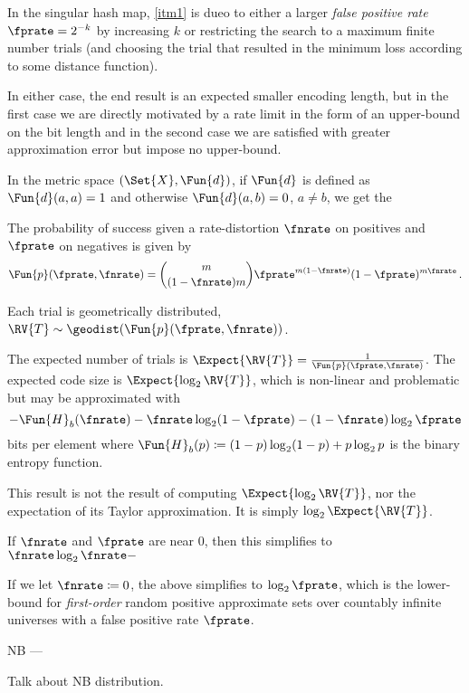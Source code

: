 \documentclass[ ../main.tex]{subfiles}
\begin{document}
In the singular hash map, \cref{itm1} is dueo to either a larger \emph{false positive rate} $\fprate = 2^{-k}$ by increasing $k$ or restricting the search to a maximum finite number trials (and choosing the trial that resulted in the minimum loss according to some distance function).

In either case, the end result is an expected smaller encoding length, but in the first case we are directly motivated by a rate limit in the form of an upper-bound on the bit length and in the second case we are satisfied with greater approximation error but impose no upper-bound.

In the metric space $(\Set{X}, \Fun{d})$, if $\Fun{d}$ is defined as $\Fun{d}(a,a) = 1$ and otherwise $\Fun{d}(a,b) = 0$, $a \neq b$, we get the 

The probability of success given a rate-distortion $\fnrate$ on positives and $\fprate$ on negatives is given by
\begin{equation}
	\Fun{p}(\fprate,\fnrate) = \binom{m}{(1-\fnrate)m} \fprate^{m(1-\fnrate)} (1-\fprate)^{m \fnrate}\,.
\end{equation}

Each trial is geometrically distributed, $\RV{T} \sim \geodist(\Fun{p}(\fprate,\fnrate))$.



The expected number of trials is $\Expect{\RV{T}} = \frac{1}{\Fun{p}(\fprate,\fnrate)}$.
The expected code size is $\Expect{\log_2 \RV{T}}$, which is non-linear and problematic but may be approximated with
\begin{equation}
	-\Fun{H}_b(\fnrate) - \fnrate \log_2 (1-\fprate) - (1-\fnrate) \log_2 \fprate
\end{equation}
bits per element where $\Fun{H}_b(p) \coloneqq (1-p)\log_2(1-p) + p \log_2 p$ is the binary entropy function.

This result is not the result of computing $\Expect{\log_2 \RV{T}}$, nor the expectation of its Taylor approximation.
It is simply $\log_2 \Expect{\RV{T}}$.

If $\fnrate$ and $\fprate$ are near $0$, then this simplifies to $\fnrate \log_2 \fnrate - $

If we let $\fnrate \coloneqq 0$, the above simplifies to $\log_2 \fprate$, which is the lower-bound for \emph{first-order} random positive approximate sets over countably infinite universes with a false positive rate $\fprate$.


NB
---

Talk about NB distribution.
\end{document}
